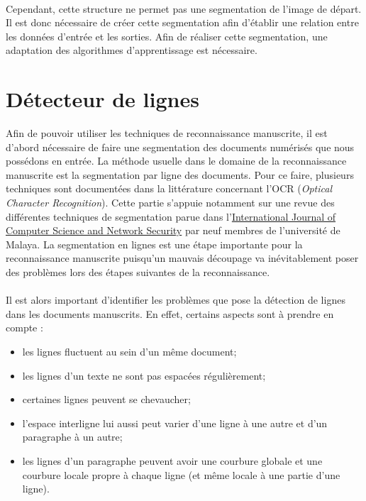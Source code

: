 \paragraph{}
Cependant, cette structure ne permet pas une segmentation de l'image de départ. Il est donc nécessaire de créer
cette segmentation afin d'établir une relation entre les données d'entrée et les sorties. Afin de réaliser cette
segmentation, une adaptation des algorithmes d'apprentissage est nécessaire.

\section{Détecteur de lignes}

Afin de pouvoir utiliser les techniques de reconnaissance manuscrite, il est d'abord nécessaire
de faire une segmentation des documents numérisés que nous possédons en entrée. La méthode
usuelle dans le domaine de la reconnaissance manuscrite est la segmentation par ligne des documents.
Pour ce faire, plusieurs techniques sont documentées dans la littérature concernant l'OCR
(\textit{Optical Character Recognition}). Cette partie s'appuie notamment sur une revue des différentes
techniques de segmentation parue dans l’\href{http://www.ijcsns.org/}{International Journal of Computer Science and Network Security}
par neuf membres de l’université de Malaya\cite{offline:2008}. La segmentation en lignes est une étape importante pour
la reconnaissance manuscrite puisqu'un mauvais découpage va inévitablement poser des problèmes
lors des étapes suivantes de la reconnaissance.

\paragraph{}
Il est alors important d'identifier les problèmes que pose la détection de lignes dans les documents manuscrits.
En effet, certains aspects sont à prendre en compte :
\begin{itemize}
\item les lignes fluctuent au sein d'un même document;
\item les lignes d'un texte ne sont pas espacées régulièrement;
\item certaines lignes peuvent se chevaucher;
\item l'espace interligne lui aussi peut varier d'une ligne à une autre et d'un paragraphe à un autre;
\item les lignes d'un paragraphe peuvent avoir une courbure globale et une courbure locale propre à
chaque ligne (et même locale à une partie d'une ligne).
\end{itemize}

